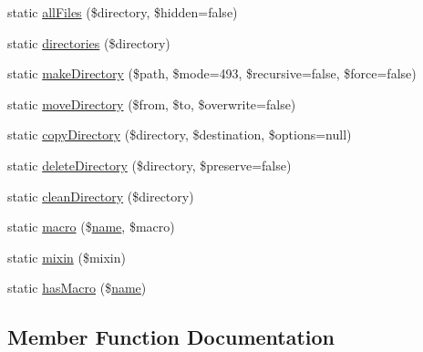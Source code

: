 \begin{DoxyCompactItemize}
\item 
static \mbox{\hyperlink{class_illuminate_1_1_support_1_1_facades_1_1_file_a1a1ef618cb8550450c2c9d2d0116677c}{all\+Files}} (\$directory, \$hidden=false)
\item 
static \mbox{\hyperlink{class_illuminate_1_1_support_1_1_facades_1_1_file_aa035c7fe1c5977b1ca3d709bf0c914a3}{directories}} (\$directory)
\item 
static \mbox{\hyperlink{class_illuminate_1_1_support_1_1_facades_1_1_file_a3eb1489a7e5c1489cf1168b662eebd1c}{make\+Directory}} (\$path, \$mode=493, \$recursive=false, \$force=false)
\item 
static \mbox{\hyperlink{class_illuminate_1_1_support_1_1_facades_1_1_file_a923b6ca0eaa520ba2030eab5e88cc917}{move\+Directory}} (\$from, \$to, \$overwrite=false)
\item 
static \mbox{\hyperlink{class_illuminate_1_1_support_1_1_facades_1_1_file_aa4b41b7c9242d5e1d12371733b00f9a3}{copy\+Directory}} (\$directory, \$destination, \$options=null)
\item 
static \mbox{\hyperlink{class_illuminate_1_1_support_1_1_facades_1_1_file_aa40074d950fe7b2f3f89a5c182b48aab}{delete\+Directory}} (\$directory, \$preserve=false)
\item 
static \mbox{\hyperlink{class_illuminate_1_1_support_1_1_facades_1_1_file_aa5d6dd162844e0bd915577ec06aedcc4}{clean\+Directory}} (\$directory)
\item 
static \mbox{\hyperlink{class_illuminate_1_1_support_1_1_facades_1_1_file_a577c40545aa409fb76915a39521db1cb}{macro}} (\$\mbox{\hyperlink{class_illuminate_1_1_support_1_1_facades_1_1_file_a07e2149571901b2cb8ee8ed3804060f3}{name}}, \$macro)
\item 
static \mbox{\hyperlink{class_illuminate_1_1_support_1_1_facades_1_1_file_a912083850797512cf5a62eaa3a39c3f0}{mixin}} (\$mixin)
\item 
static \mbox{\hyperlink{class_illuminate_1_1_support_1_1_facades_1_1_file_a6c644afd704f28fdaa3459e8c030b1e7}{has\+Macro}} (\$\mbox{\hyperlink{class_illuminate_1_1_support_1_1_facades_1_1_file_a07e2149571901b2cb8ee8ed3804060f3}{name}})
\end{DoxyCompactItemize}


\subsection{Member Function Documentation}
\mbox{\label{class_illuminate_1_1_support_1_1_facades_1_1_file_a1a1ef618cb8550450c2c9d2d0116677c}} 
